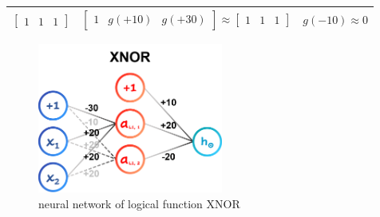 \begin{itemize}
\begin{table}[H]
\begin{tabular}{ccc}
            $\left[{\begin{array}{ccc} 1 & 1 & 1 \end{array}}\right]$  & $\left[{\begin{array}{ccc} 1 & g(+10) & g(+30) \end{array}}\right] \approx \left[{\begin{array}{ccc} 1 & 1 & 1 \end{array}}\right]$ & $g(-10) \approx 0$ \\[1ex]
            \hline\hline %
        \end{tabular}
    \end{table}

    \begin{figure}[H]
        \centering
        \includegraphics[width=2.4in]{./images/logicGate_XNOR.png}
        \caption{neural network of logical function XNOR}
    \end{figure}
    

\end{itemize}
